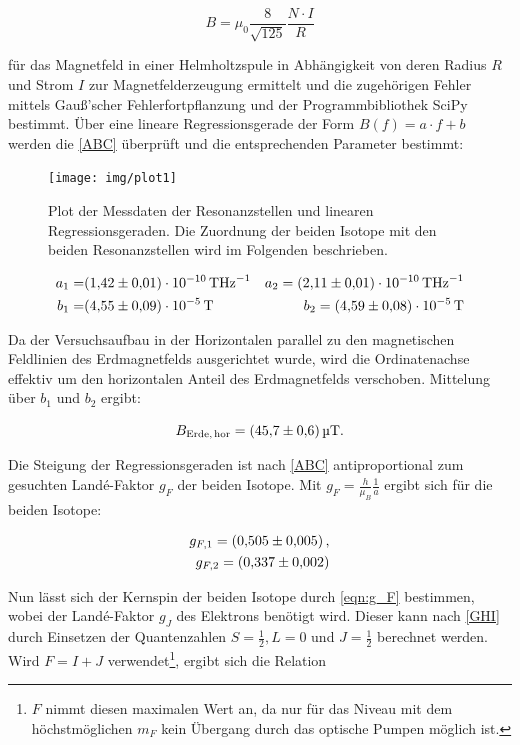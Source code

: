 \begin{equation}
	B = \mu_0 \frac{8}{\sqrt{125}} \frac{N \cdot I}{R}
	\label{helm}
\end{equation}

für das Magnetfeld in einer Helmholtzspule in Abhängigkeit von deren Radius $R$ und Strom $I$ zur Magnetfelderzeugung  ermittelt und die zugehörigen Fehler mittels Gauß'scher Fehlerfortpflanzung und der Programmbibliothek SciPy \cite{SciPy} bestimmt. Über eine lineare Regressionsgerade der Form $B(f) = a \cdot f + b$ werden die \eqref{ABC} überprüft und die entsprechenden Parameter bestimmt:

\begin{figure}
	\centering
	\caption{Plot der Messdaten der Resonanzstellen und linearen Regressionsgeraden. Die Zuordnung der beiden Isotope mit den beiden Resonanzstellen wird im Folgenden beschrieben.}
	\texttt{[image: img/plot1]}
	\label{fig:plot1}
\end{figure}





\begin{eqnarray}
	a_1 =& \SI{1.42 \pm 0.01 e-10}{\tesla \hertz^{-1}} &a_2 =  \SI{2.11 \pm 0.01 e-10}{\tesla \hertz^{-1}}\\
	b_1 =& \SI{4.55 \pm 0.09 e-5}{\tesla}  &b_2 = \SI{4.59 \pm 0.08 e-5}{\tesla} 
\end{eqnarray}

Da der Versuchsaufbau in der Horizontalen parallel zu den magnetischen Feldlinien des Erdmagnetfelds ausgerichtet wurde, wird die Ordinatenachse effektiv um den horizontalen Anteil des Erdmagnetfelds verschoben. Mittelung über $b_1$ und $b_2$ ergibt:

\begin{equation}
	B_\text{Erde,\,hor} = \SI{45.7\pm 0.6}{\micro \tesla}.
\end{equation}

Die Steigung der Regressionsgeraden ist nach \eqref{ABC} antiproportional zum gesuchten Landé-Faktor $g_F$ der beiden Isotope. Mit $g_F = \frac{h}{\mu_B} \frac{1}{a}$ ergibt sich für die beiden Isotope:

\begin{eqnarray}
	g_{F,1} = \SI{0.505 \pm 0.005},\\
	g_{F,2} = \SI{0.337 \pm 0.002}.
\end{eqnarray}

Nun lässt sich der Kernspin der beiden Isotope durch \eqref{eqn:g_F} bestimmen, wobei der Landé-Faktor $g_J$ des Elektrons benötigt wird. Dieser kann nach \eqref{GHI} durch Einsetzen der Quantenzahlen $S = \frac{1}{2}, L = 0$ und $J = \frac{1}{2}$ berechnet werden. Wird $F = I + J$ verwendet\footnote{$F$ nimmt diesen maximalen Wert an, da nur für das Niveau mit dem höchstmöglichen $m_F$ kein Übergang durch das optische Pumpen möglich ist.}, ergibt sich die Relation


